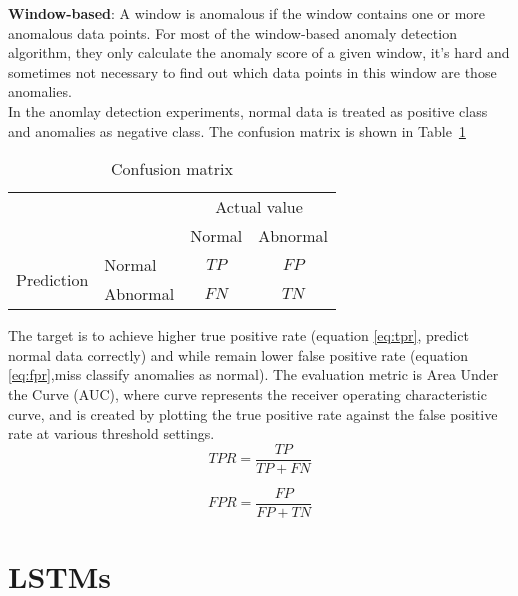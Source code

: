 \textbf{Window-based}: A window is anomalous if the window contains one or more anomalous data points. For most of the window-based anomaly detection algorithm, they only calculate the anomaly score of a given window, it’s hard and sometimes not necessary to find out which data points in this window are those anomalies.\\

In the anomlay detection experiments, normal data is treated as positive class and anomalies as negative class. The confusion matrix is shown in Table~\ref{tab:confusion}

\begin{table}[h]
\begin{center}
\begin{tabular}{l|l|c|c|}
\multicolumn{2}{c}{}&\multicolumn{2}{c}{Actual value}\\
\cline{3-4}
\multicolumn{2}{c|}{}&Normal&Abnormal\\
\cline{2-4}
\multirow{2}{*}{Prediction}& Normal & $TP$ & $FP$\\
\cline{2-4}
& Abnormal & $FN$ & $TN$\\
\cline{2-4}
\end{tabular}
\end{center}
\label{tab:confusion}
\caption{Confusion matrix}
\end{table}

The target is to achieve higher true positive rate (equation \ref{eq:tpr}, predict normal data correctly) and while remain lower false positive rate (equation \ref{eq:fpr},miss classify anomalies as normal). The evaluation metric is Area Under the Curve (AUC), where curve represents the receiver operating characteristic curve, and is created by plotting the true positive rate against the false positive rate at various threshold settings.
\begin{equation} \label{eq:tpr}
TPR =\dfrac{TP}{TP+FN}
\end{equation}

\begin{equation} \label{eq:fpr}
FPR = \dfrac{FP}{FP+TN}
\end{equation}



\section{LSTMs}
\label{sec:LSTMs}

